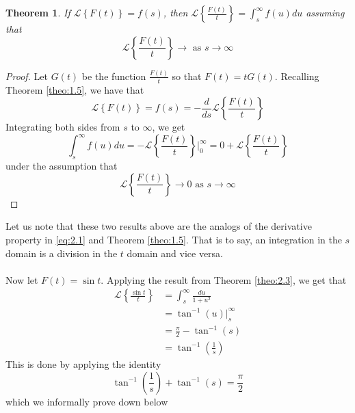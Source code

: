 \documentclass{report}
\newtheorem{theorem}{Theorem}[chapter]
\theoremstyle{definition}
\theoremstyle{remark}
\newcommand{\lapt}[1]{\mathscr{L}\left\{ #1\right\}}
\newcommand{\od}[2]{\frac{d #1}{d#2}}
\begin{document}
\begin{theorem}
    If $\lapt{F(t)} = f(s)$, then $\displaystyle{\lapt{\frac{F(t)}{t}} = \int^\infty_s f(u)du}$ assuming that 
    \begin{equation*}
        \lapt{\frac{F(t)}{t} } \rightarrow \text{ as } s\rightarrow \infty  \label{theo:2.3}
    \end{equation*}
\end{theorem}
\begin{proof}
    Let $G(t)$ be the function $\frac{F(t)}{t}$ so that $F(t)= tG(t)$. Recalling Theorem \ref{theo:1.5}, we have that 
    \begin{equation*}
        \lapt{F(t)} = f(s) = -\od{}{s}\lapt{\frac{F(t)}{t}}
    \end{equation*}
    Integrating both sides from $s$ to $\infty$, we get 
    \begin{equation*}
        \int^\infty_s f(u)du = - \lapt{\frac{F(t)}{t}} \Bigg|^\infty_0 = 0 +\lapt{\frac{F(t)}{t}} 
    \end{equation*}
    under the assumption that 
    \begin{equation*}
        \lapt{\frac{F(t)}{t}} \rightarrow0 \text{ as } s\rightarrow \infty
    \end{equation*}
    
\end{proof}
Let us note that these two results above are the analogs of the derivative property in \eqref{eq:2.1} and Theorem \ref{theo:1.5}. That is to say, an integration in the $s$ domain is a division in the $t$ domain and vice versa.
\\\\Now let $F(t) = \sin t$. Applying the result from Theorem \ref{theo:2.3}, we get that 
\begin{equation*}
    \begin{split}
        \lapt{\frac{\sin t}{t}} &= \int^\infty _ s \frac{du}{1+u^2} \\
        &= \tan ^{-1} (u) \Big|^\infty_s \\
        &= \frac{\pi}{2} - \tan^{-1}(s) \\
        &= \tan ^{-1} \left( \frac{1}{s}\right)
    \end{split}
\end{equation*}
This is done by applying the identity 
\begin{equation*}
    \tan ^{-1} \left( \frac{1}{s}\right) + \tan^{-1}(s) = \frac{\pi}{2}
\end{equation*}
which we informally prove down below 
\end{document}
